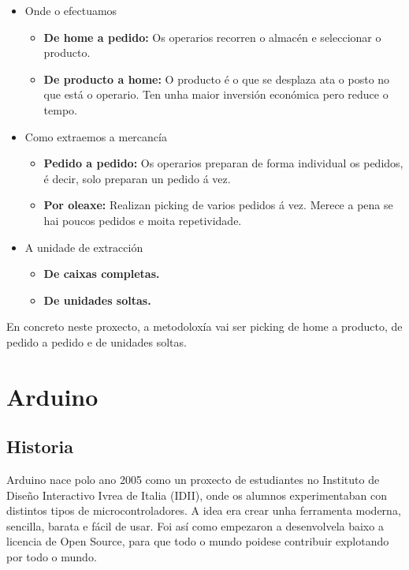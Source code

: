\documentclass[11pt,twoside]{book}
\begin{document}
\begin{itemize}
    \item Onde o efectuamos
        \begin{itemize}
            \item \textbf{De home a pedido:} Os operarios recorren o almacén e seleccionar o producto. 
            \item \textbf{De producto a home:} O producto é o que se desplaza ata o posto no que está o operario. Ten unha maior inversión económica pero reduce o tempo.
        \end{itemize}
    \item Como extraemos a mercancía
        \begin{itemize}
            \item \textbf{Pedido a pedido: } Os operarios preparan de forma individual os pedidos, é decir, solo preparan un pedido á vez. 
            \item \textbf{Por oleaxe: } Realizan picking de varios pedidos á vez. Merece a pena se hai poucos pedidos e moita repetividade. 
        \end{itemize}
    \item A unidade de extracción
        \begin{itemize}
            \item \textbf{De caixas completas.}
            \item \textbf{De unidades soltas.}
        \end{itemize}
\end{itemize}

En concreto neste proxecto, a metodoloxía vai ser picking de home a producto, de pedido a pedido e de unidades soltas.

\section{Arduino}
\subsection{Historia}

Arduino nace polo ano 2005 como un proxecto de estudiantes no Instituto de Diseño Interactivo Ivrea de Italia (IDII), onde os alumnos experimentaban con distintos tipos de microcontroladores. A idea era crear unha ferramenta moderna, sencilla, barata e fácil de usar. Foi así como empezaron a desenvolvela baixo a licencia de Open Source, para que todo o mundo poidese contribuir explotando por todo o mundo.
\end{document}
